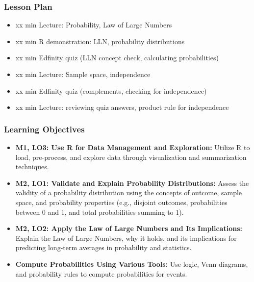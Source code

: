 \begin{frame}
    \frametitle{Lesson Plan}
    \begin{itemize}
        \item xx min Lecture: Probability, Law of Large Numbers
        \item xx min R demonstration: LLN, probability distributions
        \item xx min Edfinity quiz (LLN concept check, calculating probabilities)
        \item xx min Lecture: Sample space, independence
        \item xx min Edfinity quiz (complements, checking for independence)
        \item xx min Lecture: reviewing quiz answers, product rule for independence
    \end{itemize}
\end{frame}

\begin{frame}
    \frametitle{Learning Objectives}
    \begin{itemize}
        \item \textbf{M1, LO3: Use R for Data Management and Exploration:} Utilize R to load, pre-process, and explore data through visualization and summarization techniques.
        \item \textbf{M2, LO1: Validate and Explain Probability Distributions:} Assess the validity of a probability distribution using the concepts of outcome, sample space, and probability properties (e.g., disjoint outcomes, probabilities between 0 and 1, and total probabilities summing to 1).
        \item \textbf{M2, LO2: Apply the Law of Large Numbers and Its Implications:} Explain the Law of Large Numbers, why it holds, and its implications for predicting long-term averages in probability and statistics.
        \item \textbf{Compute Probabilities Using Various Tools:} Use logic, Venn diagrams, and probability rules to compute probabilities for events.
    \end{itemize}
\end{frame}